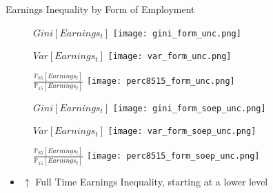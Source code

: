 \documentclass{beamer}
\begin{document}
\begin{frame}{Earnings Inequality by Form of Employment}
\begin{figure}[!t]
\centering
\begin{minipage}[b]{0.32\textwidth}{$Gini[Earnings_t]$}
\centering
\texttt{[image: gini\_form\_unc.png]}
\end{minipage}
\begin{minipage}[b]{0.32\textwidth}{$Var[Earnings_t]$}
\centering
\texttt{[image: var\_form\_unc.png]}
\end{minipage}
\begin{minipage}[b]{0.32\textwidth}{$\frac{\mathbb{P}_{85}[Earnings_t]}{\mathbb{P}_{15}[Earnings_t]}$}
\centering
\texttt{[image: perc8515\_form\_unc.png]}
\end{minipage}
\end{figure}
\begin{figure}[!t]
\centering
\begin{minipage}[b]{0.32\textwidth}{$Gini[Earnings_t]$}
\centering
\texttt{[image: gini\_form\_soep\_unc.png]}
\end{minipage}
\begin{minipage}[b]{0.32\textwidth}{$Var[Earnings_t]$}
\centering
\texttt{[image: var\_form\_soep\_unc.png]}
\end{minipage}
\begin{minipage}[b]{0.32\textwidth}{$\frac{\mathbb{P}_{85}[Earnings_t]}{\mathbb{P}_{15}[Earnings_t]}$}
\centering
\texttt{[image: perc8515\_form\_soep\_unc.png]}
\end{minipage}
\end{figure}
\begin{itemize}
\setlength{\itemsep}{0.7 cm}
\item $\uparrow$ Full Time Earnings Inequality, starting at a lower level
\end{itemize}
\end{frame}
\end{document}
